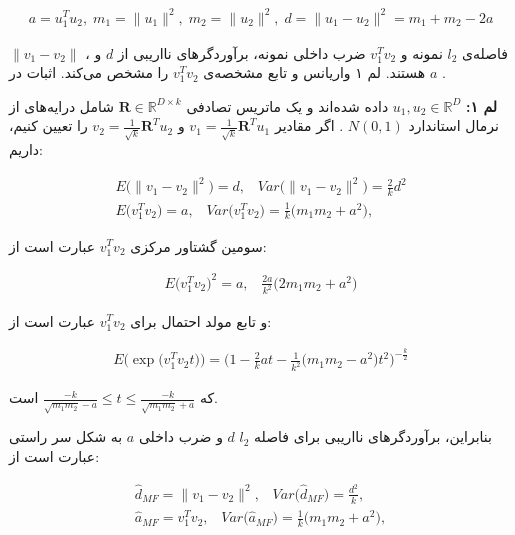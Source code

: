 \begin{align}
a= u_1^T u_2, \; m_1 = \|u_1 \|^2, \; m_2 = \| u_2 \|^2, \; d =  \| u_1 - u_2 \|^2 = m_1 + m_2 - 2a
\label{eq:1i7}
\end{align}

$\| v_1 - v_2 \|$
، فاصله‌ی 
$l_2$
نمونه و 
$v_1^T v_2$
ضرب داخلی نمونه، برآوردگرهای نااریبی از 
$d$
و 
$a$
هستند. لم ۱ واریانس و تابع مشخصه‌ی 
$v_1^T v_2$
را مشخص می‌‌کند. اثبات در 
\cite{li2007stable}
.

\textbf{لم ۱:}
$u_1, u_2 \in \mathbb{R}^D$
داده شده‌اند و یک ماتریس تصادفی
$\mathbf{R} \in \mathbb{R}^{D \times k}$
شامل درایه‌های 
از نرمال استاندارد
$N(0,1)$
. اگر مقادیر 
$v_1 = \frac{1}{\sqrt{k}} \mathbf{R}^T u_1$
و 
$v_2 = \frac{1}{\sqrt{k}} \mathbf{R}^T u_2$
را تعیین کنیم، داریم:

\begin{align}
E \big(  \| v_1 - v_2 \|^2 \big) = d, \;\;\; \mathit{Var}\big(\| v_1 - v_2 \|^2\big) = \frac{2}{k} d^2  \label{eq:1i8}\\
E \big( v_1^T v_2 \big) = a, \;\;\; \mathit{Var} \big(v_1^T v_2 \big) =  \frac{1}{k} \big(m_1 m_2 + a^2\big), \label{eq:1i9}
\end{align}

سومین گشتاور مرکزی 
$v_1^T v_2$
عبارت است از:

\begin{align}
E \big( v_1^T v_2 \big)^2 = a, \;\;\; \frac{2a}{k^2} \big( 2 m_1 m_2 + a^2 \big)
\label{eq:1iA}
\end{align}

و تابع مولد احتمال برای 
$v_1^T v_2$
عبارت است از:

\begin{align}
E \big( \exp \big( v_1^T v_2 t \big) \big)
 = \bigg(  1 - \frac{2}{k} at - \frac{1}{k^2} \big( m_1 m_2 - a^2 \big) t^2 \bigg)^{- \frac{k}{2}}
\label{eq:1iB}
\end{align}

که 
$\frac{-k}{\sqrt{m_1 m_2} - a} \leq t \leq \frac{-k}{\sqrt{m_1 m_2} + a}$
است.

بنابراین، برآوردگرهای نااریبی برای فاصله 
$l_2$
$d$
و ضرب داخلی
$a$
به شکل سر راستی عبارت است از:

\begin{align}
\hat{d}_{MF} = \| v_1 - v_2 \|^2, \;\;\; \mathit{Var} \Big( \hat{d}_{MF} \Big) = \frac{d^2}{k}, \label{eq:1iC}\\
\hat{a}_{MF} = v_1^T v_2, \;\;\; \mathit{Var} \big( \hat{a}_{MF} \big) = \frac{1}{k} \big( m_1 m_2 + a^2 \big), \label{eq:1iD}
\end{align}

